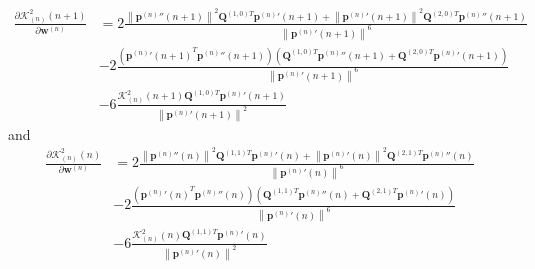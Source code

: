 \begin{equation}
\begin{split}
\frac{
\partial 
\mathcal{K}_{(n)}^{2}(n+1)
}
{
\partial \mathbf{w}^{(n)}
}
& = 
2
\frac{
\left\|{\mathbf{p}^{(n)}}''(n+1)\right\|^2
\mathbf{Q}^{(1,0)T} {\mathbf{p}^{(n)}}'(n+1)
+
\left\|{\mathbf{p}^{(n)}}'(n+1)\right\|^2
\mathbf{Q}^{(2,0)T} {\mathbf{p}^{(n)}}''(n+1)
}
{\left\| {\mathbf{p}^{(n)}}'(n+1) \right\|^{6}}\\[10pt]
& - 
2
\frac
{
\left(
{{\mathbf{p}^{(n)}}'(n+1)}^{T}
{\mathbf{p}^{(n)}}''(n+1)
\right)
\left(
\mathbf{Q}^{(1,0)T}{\mathbf{p}^{(n)}}''(n+1)
+
\mathbf{Q}^{(2,0)T}{\mathbf{p}^{(n)}}'(n+1)
\right)
}
{\left\| {\mathbf{p}^{(n)}}'(n+1) \right\|^{6}}\\[10pt]
& - 
6
\frac
{
\mathcal{K}_{(n)}^{2}(n+1)
\mathbf{Q}^{(1,0)T}{\mathbf{p}^{(n)}}'(n+1)
}
{\left\| {\mathbf{p}^{(n)}}'(n+1) \right\|^{2}}
\end{split}
\end{equation}
and
\begin{equation}
\begin{split}
\frac{
\partial 
\mathcal{K}_{(n)}^{2}(n)
}
{
\partial \mathbf{w}^{(n)}
}
& = 
2
\frac{
\left\|{\mathbf{p}^{(n)}}''(n)\right\|^2
\mathbf{Q}^{(1,1)T} {\mathbf{p}^{(n)}}'(n)
+
\left\|{\mathbf{p}^{(n)}}'(n)\right\|^2
\mathbf{Q}^{(2,1)T} {\mathbf{p}^{(n)}}''(n)
}
{\left\| {\mathbf{p}^{(n)}}'(n) \right\|^{6}}\\[10pt]
& - 
2
\frac
{
\left(
{{\mathbf{p}^{(n)}}'(n)}^{T}
{\mathbf{p}^{(n)}}''(n)
\right)
\left(
\mathbf{Q}^{(1,1)T}{\mathbf{p}^{(n)}}''(n)
+
\mathbf{Q}^{(2,1)T}{\mathbf{p}^{(n)}}'(n)
\right)
}
{\left\| {\mathbf{p}^{(n)}}'(n) \right\|^{6}}\\[10pt]
& - 
6
\frac
{
\mathcal{K}_{(n)}^{2}(n)
\mathbf{Q}^{(1,1)T}{\mathbf{p}^{(n)}}'(n)
}
{\left\| {\mathbf{p}^{(n)}}'(n) \right\|^{2}}
\end{split}
\end{equation}


\begin{comment}
Finally

\begin{equation}
\frac{
\partial 
\mathcal{K}_{(n)}^{2}(n+1)
}
{
\partial \mathbf{w}^{(n)}
}
\end{equation}
\end{comment}
